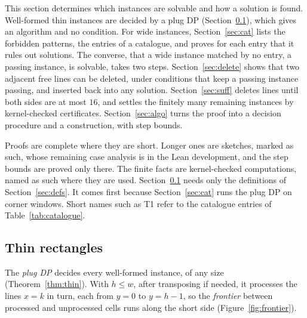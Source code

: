 \documentclass[11pt]{article}
\makeatletter
\newcommand{\ent}[1]{\textsf{#1}}
\newcommand{\secmark}[1]{\pdfsavepos\protected@write\@auxout{}{\string\secpos{#1}{\thepage}{\noexpand\the\noexpand\pdflastypos}}}
\def\secpos#1#2#3{}
\makeatother
\begin{document}
This section determines which instances are solvable and how a solution is found.
Well-formed thin instances are decided by a plug DP (Section~\ref{sec:thin}), which gives an
algorithm and no condition. For wide instances, Section~\ref{sec:cat} lists the forbidden patterns,
the entries of a catalogue, and proves for each entry that it rules out solutions. The converse,
that a wide instance matched by no entry, a passing instance, is solvable, takes two steps.
Section~\ref{sec:delete} shows that two adjacent free lines can be deleted, under conditions that
keep a passing instance passing, and inserted back into any solution. Section~\ref{sec:suff}
deletes lines until both sides are at most $16$, and settles the finitely many remaining instances
by kernel-checked certificates. Section~\ref{sec:algo} turns the proof into a decision procedure
and a construction, with step bounds.

Proofs are complete where they are short. Longer ones are sketches, marked as such, whose
remaining case analysis is in the Lean development, and the step bounds are proved only there. The
finite facts are kernel-checked computations, named as such where they are used.
Section~\ref{sec:thin} needs only the definitions of Section~\ref{sec:defs}. It comes first because
Section~\ref{sec:cat} runs the plug DP on corner windows. Short names such as \ent{T1} refer to the
catalogue entries of Table~\ref{tab:catalogue}.

\secmark{thin}
\subsection{Thin rectangles}\label{sec:thin}

The \emph{plug DP} decides every well-formed instance, of any size (Theorem~\ref{thm:thin}). With
$h\le w$, after transposing if needed, it processes the lines $x=k$ in turn, each from $y=0$ to
$y=h-1$, so the \emph{frontier} between processed and unprocessed cells runs along the short side
(Figure~\ref{fig:frontier}).
\end{document}
